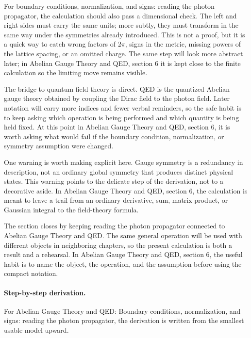 For boundary conditions, normalization, and signs: reading the photon propagator, the calculation should also pass a dimensional check.  The left and right sides must carry the same units; more subtly, they must transform in the same way under the symmetries already introduced.  This is not a proof, but it is a quick way to catch wrong factors of \(2\pi\), signs in the metric, missing powers of the lattice spacing, or an omitted charge.  The same step will look more abstract later; in Abelian Gauge Theory and QED, section 6 it is kept close to the finite calculation so the limiting move remains visible.

The bridge to quantum field theory is direct.  QED is the quantized Abelian gauge theory obtained by coupling the Dirac field to the photon field.  Later notation will carry more indices and fewer verbal reminders, so the safe habit is to keep asking which operation is being performed and which quantity is being held fixed.  At this point in Abelian Gauge Theory and QED, section 6, it is worth asking what would fail if the boundary condition, normalization, or symmetry assumption were changed.

One warning is worth making explicit here.  Gauge symmetry is a redundancy in description, not an ordinary global symmetry that produces distinct physical states.  This warning points to the delicate step of the derivation, not to a decorative aside.  In Abelian Gauge Theory and QED, section 6, the calculation is meant to leave a trail from an ordinary derivative, sum, matrix product, or Gaussian integral to the field-theory formula.

The section closes by keeping reading the photon propagator connected to Abelian Gauge Theory and QED.  The same general operation will be used with different objects in neighboring chapters, so the present calculation is both a result and a rehearsal.  In Abelian Gauge Theory and QED, section 6, the useful habit is to name the object, the operation, and the assumption before using the compact notation.



\paragraph{Step-by-step derivation.}

For Abelian Gauge Theory and QED: Boundary conditions, normalization, and signs: reading the photon propagator, the derivation is written from the smallest usable model upward.

